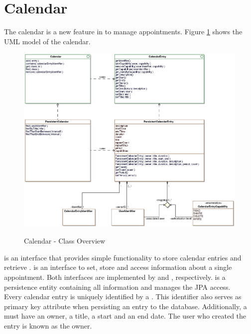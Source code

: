 \newpage
\section{Calendar}
\label{sec:calendar}

The calendar is a new feature in \salespoint{} to manage appointments.
Figure \ref{calendar_overview} shows the UML model of the calendar.

\begin{figure}[ht]
	\centering
  \includegraphics[width=1.0\textwidth]{images/Calendar_Overview.eps}
	\label{calendar_overview}
	\caption{Calendar - Class Overview}
\end{figure}

 is an interface that provides simple functionality to store calendar entries and retrieve .
 is an interface to set, store and access information about a single appointment.
Both interfaces are implemented by  and , respectively.
 is a persistence entity containing all information and  manages the JPA access.
\\

Every calendar entry is uniquely identified by a .
This identifier also serves as primary key attribute when persisting an entry to the database.
Additionally, a  must have an owner, a title, a start and an end date.
The user who created the entry is known as the owner.
\\

